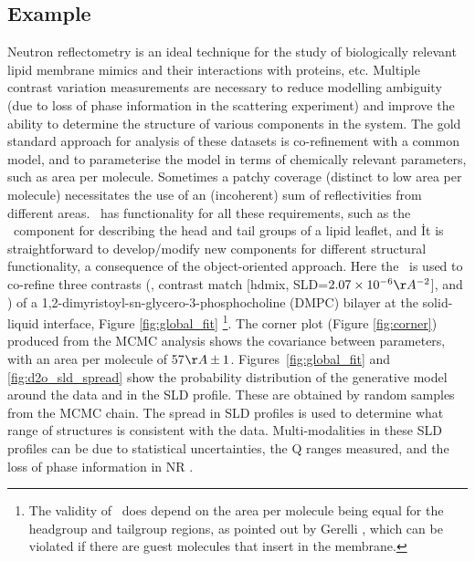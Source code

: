 \documentclass[12pt]{article}
\begin{document}
\subsection*{Example}
Neutron reflectometry is an ideal technique for the study of biologically relevant lipid membrane mimics and their interactions with proteins, etc. Multiple contrast variation measurements are necessary to reduce modelling ambiguity (due to loss of phase information in the scattering experiment) and improve the ability to determine the structure of various components in the system. The gold standard approach for analysis of these datasets is co-refinement with a common model, and to parameterise the model in terms of chemically relevant parameters, such as area per molecule. Sometimes a patchy coverage (distinct to low area per molecule) necessitates the use of an (incoherent) sum of reflectivities from different areas. \ has functionality for all these requirements, such as the \LipidLeaflet\ component for describing the head and tail groups of a lipid leaflet, and \MixedReflectModel\. It is straightforward to develop/modify new components for different structural functionality, a consequence of the object-oriented approach. Here the \LipidLeaflet\ is used to co-refine three contrasts (,  contrast match [hdmix, SLD=$2.07\times10^{-6}\AA^{-2}$], and ) of a 1,2-dimyristoyl-sn-glycero-3-phosphocholine (DMPC) bilayer at the solid-liquid interface, Figure \ref{fig:global_fit} \footnote{The validity of \LipidLeaflet\ does depend on the area per molecule being equal for the headgroup and tailgroup regions, as pointed out by Gerelli \cite{Gerelli2016}, which can be violated if there are guest molecules that insert in the membrane.}. The corner plot (Figure \ref{fig:corner}) produced from the MCMC analysis shows the covariance between parameters, with an area per molecule of 57$\AA\pm1$. Figures~\ref{fig:global_fit} and \ref{fig:d2o_sld_spread} show the probability distribution of the generative model around the data and in the SLD profile. These are obtained by random samples from the MCMC chain. The spread in SLD profiles is used to determine what range of structures is consistent with the data. Multi-modalities in these SLD profiles can be due to statistical uncertainties, the Q ranges measured, and the loss of phase information in NR \cite{Majkrzak1999, Heinrich2009}.
\end{document}

